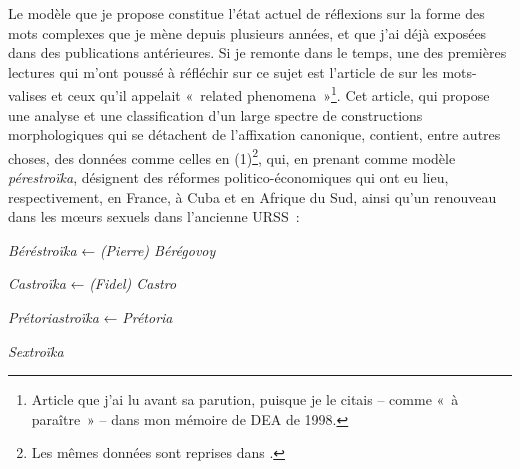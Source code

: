 \documentclass[output=paper]{langsci/langscibook}
\begin{document}
Le modèle que je propose constitue l'état actuel de réflexions sur la
forme des mots complexes que je mène depuis plusieurs années, et que
j'ai déjà exposées dans des publications antérieures. Si je remonte dans
le temps, une des premières lectures qui m'ont poussé à réfléchir sur ce
sujet est l'article de %
\citet{Fradin2000} %
%
sur les mots-valises et ceux qu'il
appelait «~related phenomena~»\footnote{Article que j'ai lu avant sa
  parution, puisque je le citais -- comme «~à paraître~» -- dans mon
  mémoire de DEA de 1998.}. Cet article, qui propose une analyse et une
classification d'un large spectre de constructions morphologiques qui se
détachent de l'affixation canonique, contient, entre autres choses, des
données comme celles en (1)\footnote{Les mêmes données sont reprises
  dans %
\citet[212--213]{Fradin03}%
%
.}, qui, en prenant comme modèle
\emph{pérestroïka}, désignent des réformes politico-économiques qui ont
eu lieu, respectivement, en France, à Cuba et en Afrique du Sud, ainsi
qu'un renouveau dans les mœurs sexuels dans l'ancienne URSS~:

\ea \label{ex:Montermini:1}
    \ea \emph{Béréstroïka} ← \emph{(Pierre) Bérégovoy}

    \ex \emph{Castroïka} ← \emph{(Fidel) Castro}

    \ex \emph{Prétoriastroïka} ← \emph{Prétoria}

    \ex \emph{Sextroïka}
\z\z
\end{document}
